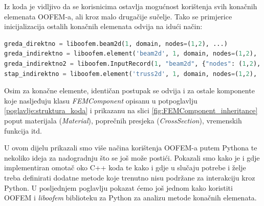 \documentclass[a4paper,twoside,12pt]{memoir} %
\begin{document}
Iz koda je vidljivo da se korisnicima ostavlja mogućnost korištenja svih konačnih elemenata OOFEM-a, ali kroz malo drugačije sučelje. Tako se primjerice inicijalizacija ostalih konačnih elemenata odvija na idući način:

\begin{lstlisting}[language=python, caption={Primjer konstrukcije konačnih elemenata koji nemaju implementiran direktan poziv}]
greda_direktno = liboofem.beam2d(1, domain, nodes=(1,2), ...)
greda_indirektno = liboofem.element('beam2d', 1, domain, nodes=(1,2), ...)
greda_indirektno2 = liboofem.InputRecord(1, "beam2d", {"nodes": (1,2), ...})
stap_indirektno = liboofem.element('truss2d', 1, domain, nodes=(1,2), ...)
\end{lstlisting}

Osim za konačne elemente, identičan postupak se odvija i za ostale komponente koje nasljeđuju klasu \textit{FEMComponent} opisanu u potpoglavlju \ref{poglavlje:struktura_koda} i prikazanu na slici \ref{fig:FEMComponent_inheritance} poput materijala (\textit{Material}), poprečnih presjeka (\textit{CrossSection}), vremenskih funkcija itd. \par

U ovom dijelu prikazali smo više načina korištenja OOFEM-a putem Pythona te nekoliko ideja za nadogradnju što se još može postići. Pokazali smo kako je i gdje implementiran omotač oko C++ koda te kako i gdje u slučaju potrebe i želje treba definirati dodatne metode koje trenutno nisu podržane za interakciju kroz Python. U posljednjem poglavlju pokazat ćemo još jednom kako koristiti OOFEM i \textit{liboofem} biblioteku za Python za analizu metode konačnih elemenata.
\end{document}
